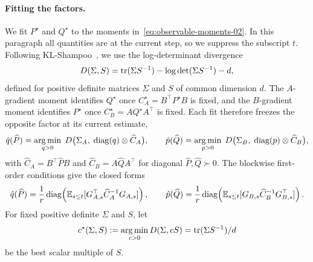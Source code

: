 \paragraph{Fitting the factors.} We fit $P^\star$ and $Q^\star$ to the
moments in~\eqref{eq:observable-moments-02}. In this paragraph all
quantities are at the current step, so we suppress the subscript $t$.
Following KL-Shampoo~\cite{klshampoo}, we use the log-determinant
divergence~\cite{logdetdiv}
\[
  D(\Sigma,S)=\operatorname{tr}(\Sigma S^{-1})-\log\det(\Sigma S^{-1})-d,
\]
defined for positive definite matrices $\Sigma$ and $S$ of common dimension
$d$. The $A$-gradient moment identifies $Q^\star$ once
$C^\star_A=B^\top P^\star B$ is fixed, and the $B$-gradient moment
identifies $P^\star$ once $C^\star_B=AQ^\star A^\top$ is fixed. Each fit
therefore freezes the opposite factor at its current estimate,
\begin{equation}\label{eq:factor-fit-02}
  \hat{q}(\widehat P)
  =\operatorname*{arg\,min}_{q>0}\;
  D\big(\Sigma_A,\; \operatorname{diag}(q) \otimes \widehat C_A\big),
  \qquad
  \hat{p}(\widehat Q)
  =\operatorname*{arg\,min}_{p>0}\;
  D\big(\Sigma_B,\;\operatorname{diag}(p) \otimes \widehat C_B\big),
\end{equation}
with $\widehat C_A=B^\top\widehat PB$ and $\widehat C_B=A\widehat QA^\top$
for diagonal $\widehat P,\widehat Q\succ0$. The blockwise first-order
conditions give the closed forms
\[
  \hat{q}(\widehat P)=\frac1r\operatorname{diag}\!\left(\mathbb{E}_{s \leq t}[G_{A,s}^\top \widehat C_A^{-1}G_{A,s}]\right),
  \qquad
  \hat{p}(\widehat Q)=\frac1r\operatorname{diag}\!\left(\mathbb{E}_{s \leq t}[G_{B,s} \widehat C_B^{-1}G_{B,s}^\top]\right).
\]
For fixed positive definite $\Sigma$ and $S$, let
\[
  c^\star(\Sigma,S) :=\operatorname*{arg\,min}_{c>0}D(\Sigma,cS)=\operatorname{tr}(\Sigma S^{-1})/d
\]
be the best scalar multiple of $S$.

